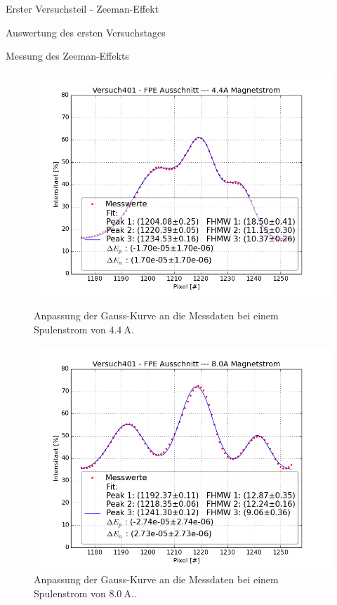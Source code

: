 \documentclass[pdftex, a4paper,11pt, twoside, ngerman]{report}
\begin{document}
\begin{chapter}{Erster Versuchsteil - Zeeman-Effekt}
\begin{section}{Auswertung des ersten Versuchstages}
\begin{subsection}{Messung des Zeeman-Effekts}
\begin{figure}[ht]
\begin{minipage}{0.48\textwidth}
            \includegraphics[width=\textwidth]
      {Figures/Versuch401-FPEAusschnitt-4_4AMagnetstrom_Pixel_Intensitaet.png}
            \caption{Anpassung der Gauss-Kurve an die Messdaten bei einem
                Spulenstrom von $\SI{4.4}{\ampere}$.}
            \label{fig:FPEAusschnitt44}
          \end{minipage}\quad
          \begin{minipage}{0.48\textwidth}
            \centering
            \includegraphics[width=\textwidth]
      {Figures/Versuch401-FPEAusschnitt-8_0AMagnetstrom_Pixel_Intensitaet.png}
                \caption{Anpassung der Gauss-Kurve an die Messdaten bei einem
                Spulenstrom von $\SI{8.0}{\ampere}$..}
            \label{fig:FPEAusschnitt80}

\end{minipage}
\end{figure}
\end{subsection}
\end{section}
\end{chapter}
\end{document}
